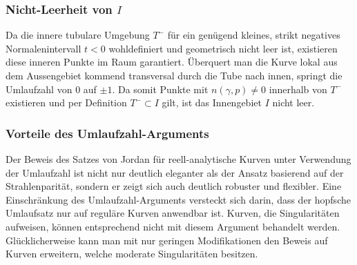 \subsubsection{Nicht-Leerheit von $I$
\label{jordan:subsubsection:nichtleerheit_innen_reell_analytisch_umlaufzahl}}

Da die innere tubulare Umgebung $T^{-}$ für ein genügend kleines, strikt negatives Normalenintervall $t < 0$ wohldefiniert und geometrisch nicht leer ist, existieren diese inneren Punkte im Raum garantiert. 
Überquert man die Kurve lokal aus dem Aussengebiet kommend transversal durch die Tube nach innen, springt die Umlaufzahl von $0$ auf $\pm 1$. 
Da somit Punkte mit $n(\gamma, p) \neq 0$ innerhalb von $T^{-}$ existieren und per Definition $T^{-} \subset I$ gilt, ist das Innengebiet $I$ nicht leer.

\subsubsection{Vorteile des Umlaufzahl-Arguments
\label{jordan:subsubsection:vorteile_umlaufzahl}}

Der Beweis des Satzes von Jordan für reell-analytische Kurven unter Verwendung der Umlaufzahl ist nicht nur deutlich eleganter als der Ansatz basierend auf der Strahlenparität, sondern er zeigt sich auch deutlich robuster und flexibler.
Eine Einschränkung des Umlaufzahl-Arguments versteckt sich darin, dass der hopfsche Umlaufsatz nur auf reguläre Kurven anwendbar ist.
Kurven, die Singularitäten aufweisen, können entsprechend nicht mit diesem Argument behandelt werden.
Glücklicherweise kann man mit nur geringen Modifikationen den Beweis auf Kurven erweitern, welche moderate Singularitäten besitzen.
